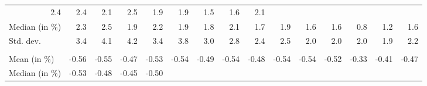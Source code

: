 \begin{tabular}{lllllllllllllll}
  \multicolumn{1}{r}{2.4} &
  \multicolumn{1}{r}{2.4} &
  \multicolumn{1}{r}{2.1} &
  \multicolumn{1}{r}{2.5} &
  \multicolumn{1}{r}{1.9} &
  \multicolumn{1}{r}{1.9} &
  \multicolumn{1}{r}{1.5} &
  \multicolumn{1}{r}{1.6} &
  \multicolumn{1}{r}{2.1} \\
\multicolumn{1}{l}{\hspace{2em}Median (in $\%$)} &
  \multicolumn{1}{|r}{2.3} &
  \multicolumn{1}{r}{2.5} &
  \multicolumn{1}{r}{1.9} &
  \multicolumn{1}{r}{2.2} &
  \multicolumn{1}{r}{1.9} &
  \multicolumn{1}{r}{1.8} &
  \multicolumn{1}{r}{2.1} &
  \multicolumn{1}{r}{1.7} &
  \multicolumn{1}{r}{1.9} &
  \multicolumn{1}{r}{1.6} &
  \multicolumn{1}{r}{1.6} &
  \multicolumn{1}{r}{0.8} &
  \multicolumn{1}{r}{1.2} &
  \multicolumn{1}{r}{1.6} \\
\multicolumn{1}{l}{\hspace{2em}Std. dev.} &
  \multicolumn{1}{|r}{3.4} &
  \multicolumn{1}{r}{4.1} &
  \multicolumn{1}{r}{4.2} &
  \multicolumn{1}{r}{3.4} &
  \multicolumn{1}{r}{3.8} &
  \multicolumn{1}{r}{3.0} &
  \multicolumn{1}{r}{2.8} &
  \multicolumn{1}{r}{2.4} &
  \multicolumn{1}{r}{2.5} &
  \multicolumn{1}{r}{2.0} &
  \multicolumn{1}{r}{2.0} &
  \multicolumn{1}{r}{2.0} &
  \multicolumn{1}{r}{1.9} &
  \multicolumn{1}{r}{2.2} \\
\multicolumn{1}{l}{\hspace{1em}{\textit{Elasticity} ($\widehat{\beta}$)}} &
  \multicolumn{1}{|r}{} &
  \multicolumn{1}{r}{} &
  \multicolumn{1}{r}{} &
  \multicolumn{1}{r}{} &
  \multicolumn{1}{r}{} &
  \multicolumn{1}{r}{} &
  \multicolumn{1}{r}{} &
  \multicolumn{1}{r}{} &
  \multicolumn{1}{r}{} &
  \multicolumn{1}{r}{} &
  \multicolumn{1}{r}{} &
  \multicolumn{1}{r}{} &
  \multicolumn{1}{r}{} &
  \multicolumn{1}{r}{} \\
\multicolumn{1}{l}{\hspace{2em}Mean (in $\%$)} &
  \multicolumn{1}{|r}{-0.56} &
  \multicolumn{1}{r}{-0.55} &
  \multicolumn{1}{r}{-0.47} &
  \multicolumn{1}{r}{-0.53} &
  \multicolumn{1}{r}{-0.54} &
  \multicolumn{1}{r}{-0.49} &
  \multicolumn{1}{r}{-0.54} &
  \multicolumn{1}{r}{-0.48} &
  \multicolumn{1}{r}{-0.54} &
  \multicolumn{1}{r}{-0.54} &
  \multicolumn{1}{r}{-0.52} &
  \multicolumn{1}{r}{-0.33} &
  \multicolumn{1}{r}{-0.41} &
  \multicolumn{1}{r}{-0.47} \\
\multicolumn{1}{l}{\hspace{2em}Median (in $\%$)} &
  \multicolumn{1}{|r}{-0.53} &
  \multicolumn{1}{r}{-0.48} &
  \multicolumn{1}{r}{-0.45} &
  \multicolumn{1}{r}{-0.50} &

\end{tabular}
